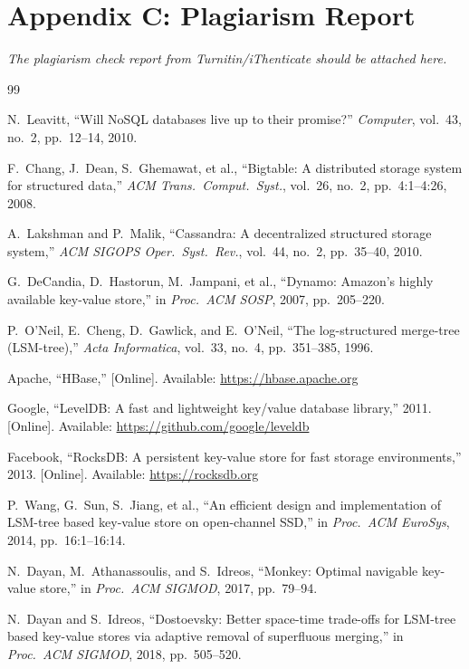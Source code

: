 \documentclass[oneside,a4paper,12pt]{book}
\begin{document}
\section{Appendix C: Plagiarism Report}

\textit{The plagiarism check report from Turnitin/iThenticate should be attached here.}


\begin{thebibliography}{99}

N.~Leavitt, ``Will NoSQL databases live up to their promise?'' \textit{Computer}, vol.~43, no.~2, pp.~12--14, 2010.

F.~Chang, J.~Dean, S.~Ghemawat, et al., ``Bigtable: A distributed storage system for structured data,'' \textit{ACM Trans.\ Comput.\ Syst.}, vol.~26, no.~2, pp.~4:1--4:26, 2008.

A.~Lakshman and P.~Malik, ``Cassandra: A decentralized structured storage system,'' \textit{ACM SIGOPS Oper.\ Syst.\ Rev.}, vol.~44, no.~2, pp.~35--40, 2010.

G.~DeCandia, D.~Hastorun, M.~Jampani, et al., ``Dynamo: Amazon's highly available key-value store,'' in \textit{Proc.\ ACM SOSP}, 2007, pp.~205--220.

P.~O'Neil, E.~Cheng, D.~Gawlick, and E.~O'Neil, ``The log-structured merge-tree (LSM-tree),'' \textit{Acta Informatica}, vol.~33, no.~4, pp.~351--385, 1996.

Apache, ``HBase,'' [Online]. Available: \url{https://hbase.apache.org}

Google, ``LevelDB: A fast and lightweight key/value database library,'' 2011. [Online]. Available: \url{https://github.com/google/leveldb}

Facebook, ``RocksDB: A persistent key-value store for fast storage environments,'' 2013. [Online]. Available: \url{https://rocksdb.org}

P.~Wang, G.~Sun, S.~Jiang, et al., ``An efficient design and implementation of LSM-tree based key-value store on open-channel SSD,'' in \textit{Proc.\ ACM EuroSys}, 2014, pp.~16:1--16:14.

N.~Dayan, M.~Athanassoulis, and S.~Idreos, ``Monkey: Optimal navigable key-value store,'' in \textit{Proc.\ ACM SIGMOD}, 2017, pp.~79--94.

N.~Dayan and S.~Idreos, ``Dostoevsky: Better space-time trade-offs for LSM-tree based key-value stores via adaptive removal of superfluous merging,'' in \textit{Proc.\ ACM SIGMOD}, 2018, pp.~505--520.


\end{thebibliography}
\end{document}
